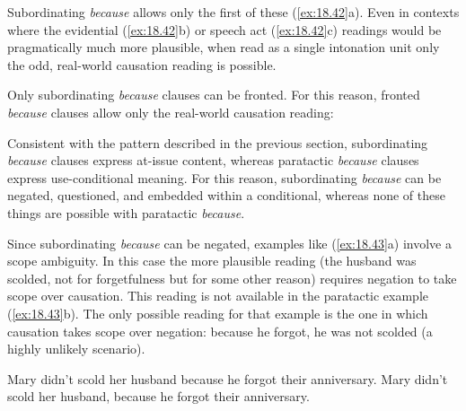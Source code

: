 Subordinating \textit{because} allows only the first of these (\ref{ex:18.42}a). Even in contexts where the evidential (\ref{ex:18.42}b) or speech act (\ref{ex:18.42}c) readings would be pragmatically much more plausible, when read as a single intonation unit only the odd, real-world causation reading is possible.


\ea \label{ex:18.42}
 \z
\z


Only subordinating \textit{because} clauses can be fronted. For this reason, fronted \textit{because} clauses allow only the real-world causation reading:


\ea \label{ex:18.15}
                       \z
\z


Consistent with the pattern described in the previous section, subordinating \textit{because} clauses express at-issue content, whereas paratactic \textit{because} clauses express use-conditional meaning. For this reason, subordinating \textit{because} can be negated, questioned, and embedded within a conditional, whereas none of these things are possible with paratactic \textit{because}.


Since subordinating \textit{because} can be negated, examples like (\ref{ex:18.43}a) involve a scope ambiguity. In this case the more plausible reading (the husband was scolded, not for forgetfulness but for some other reason) requires negation to take scope over causation. This reading is not available in the paratactic example (\ref{ex:18.43}b). The only possible reading for that example is the one in which causation takes scope over negation: because he forgot, he was not scolded (a highly unlikely scenario).


\ea \label{ex:18.43}
\ea  Mary didn’t scold her husband because he forgot their anniversary.
\ex Mary didn’t scold her husband, because he forgot their anniversary.
                       \z
\z



